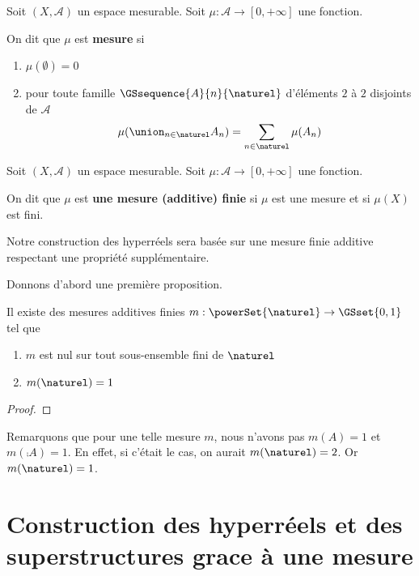 \documentclass[a4paper, 12pt]{report}
\begin{document}
\begin{definition}
	Soit $(X, \mathcal{A})$ un espace mesurable.
	Soit $\mu : \mathcal{A} \rightarrow [0, + \infty]$ une fonction.

	On dit que $\mu$ est \textbf{mesure} si
	\begin{enumerate}
		\item $\mu(\emptyset) = 0$
		\item pour toute famille $\GSsequence{A}{n}{\naturel}$ d'éléments $2$ à
			$2$ disjoints de $\mathcal{A}$
			\begin{equation}
				\mu(\union_{n \in \naturel} A_{n}) = \sum_{n \in \naturel}
				\mu(A_{n})
			\end{equation}
	\end{enumerate}
\end{definition}

\begin{definition}
	Soit $(X, \mathcal{A})$ un espace mesurable.
	Soit $\mu : \mathcal{A} \rightarrow [0, + \infty]$ une fonction.

	On dit que $\mu$ est \textbf{une mesure (additive) finie} si $\mu$ est une
	mesure et si $\mu(X)$ est fini.
\end{definition}

Notre construction des hyperréels sera basée sur une mesure finie additive
respectant une propriété supplémentaire.

Donnons d'abord une première proposition.

\begin{proposition}
	Il existe des mesures additives finies $m : \powerSet{\naturel} \rightarrow
	\GSset{0, 1}$ tel que
	\begin{enumerate}
		\item $m$ est nul sur tout sous-ensemble fini de $\naturel$
		\item $m(\naturel) = 1$
	\end{enumerate}
\end{proposition}

\ifdefined\outputproof
\begin{proof}

\end{proof}
\fi

Remarquons que pour une telle mesure $m$, nous n'avons pas $m(A) = 1$ et
$m(\comp{A}) = 1$. En effet, si c'était le cas, on aurait $m(\naturel) = 2$. Or
$m(\naturel) = 1$.

\chapter{Construction des hyperréels et des superstructures grace à une mesure}
\end{document}
